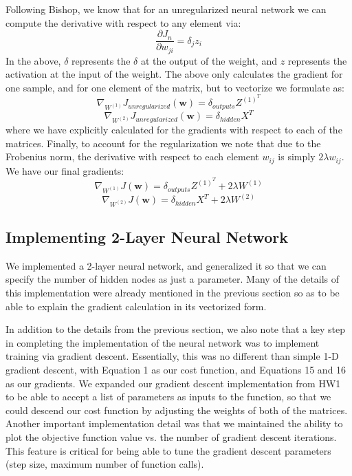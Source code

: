 \documentclass[10pt]{article}
\begin{document}
Following Bishop, we know that for an unregularized neural network we can compute the derivative with respect to any element via:
%
%
\begin{equation}
\frac{\partial J_n}{\partial w_{ji}} = \delta_j z_i
\end{equation}
%
%
In the above, $\delta$ represents the $\delta$ at the output of the weight, and $z$ represents the activation at the input of the weight.  The above only calculates the gradient for one sample, and for one element of the matrix, but to vectorize we formulate as:
%
%
\begin{equation}
\nabla_{W^{(1)}} J_{unregularized}(\mathbf{w}) = \delta_{outputs} Z^{(1)^T}
\end{equation}
%
%
\begin{equation}
\nabla_{W^{(2)}} J_{unregularized}(\mathbf{w}) = \delta_{hidden} X^T
\end{equation}
%
%
where we have explicitly calculated for the gradients with respect to each of the matrices.  Finally, to account for the regularization we note that due to the Frobenius norm, the derivative with respect to each element $w_{ij}$ is simply $2 \lambda w_{ij}$.  We have our final gradients:
%
%
\begin{equation}
\nabla_{W^{(1)}} J(\mathbf{w}) = \delta_{outputs} Z^{(1)^T} + 2 \lambda W^{(1)}
\end{equation}
%
%
\begin{equation}
\nabla_{W^{(2)}} J(\mathbf{w}) = \delta_{hidden} X^T + 2  \lambda W^{(2)}
\end{equation}
%
%


\subsection*{Implementing 2-Layer Neural Network}

We implemented a 2-layer neural network, and generalized it so that we can specify the number of hidden nodes as just a parameter.  Many of the details of this implementation were already mentioned in the previous section so as to be able to explain the gradient calculation in its vectorized form.  

In addition to the details from the previous section, we also note that a key step in completing the implementation of the neural network was to implement training via gradient descent.  Essentially, this was no different than simple 1-D gradient descent, with Equation 1 as our cost function, and Equations 15 and 16 as our gradients.  We expanded our gradient descent implementation from HW1 to be able to accept a list of parameters as inputs to the function, so that we could descend our cost function by adjusting the weights of both of the matrices.  Another important implementation detail was that we maintained the ability to plot the objective function value vs. the number of gradient descent iterations.  This feature is critical for being able to tune the gradient descent parameters (step size, maximum number of function calls).  
\end{document}
